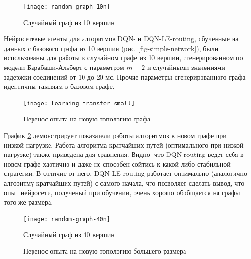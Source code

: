 \documentclass[specification,annotation,times]{itmo-student-thesis}
\theoremstyle{definition}
\begin{document}
\begin{figure}[!h]
  \caption{Случайный граф из 10 вершин}\label{fig-random-net-10n}
  \centering
  \texttt{[image: random-graph-10n]}
\end{figure}

Нейросетевые агенты для алгоритмов DQN- и DQN-LE-routing, обученные на данных с
базового графа из 10 вершин (рис. \ref{fig-simple-network}), были использованы
для работы в случайном графе из 10 вершин, сгенерированном по модели
Барабаши-Альберт с параметром $m = 2$ и случайными значениями задержки
соединений от 10 до 20 мс. Прочие параметры сгенерированного графа идентичны
таковым в базовом графе. 

\begin{figure}[!h]
  \caption{Перенос опыта на новую топологию графа}\label{experiments:network:transfer-small}
  \centering
  \texttt{[image: learning-transfer-small]}
\end{figure}

График \ref{experiments:network:transfer-small} демонстрирует показатели работы
алгоритмов в новом графе при низкой нагрузке. Работа алгоритма кратчайших
путей (оптимального при низкой нагрузке) также приведена для сравнения. Видно,
что DQN-routing ведет себя в новом графе хаотично и даже не способен сойтись к
какой-либо стабильной стратегии. В отличие от него, DQN-LE-routing работает
оптимально (аналогично алгоритму кратчайших путей) с самого начала, что
позволяет сделать вывод, что опыт нейросети, полученый при обучении, очень
хорошо обобщается на графы того же размера.

\begin{figure}[!h]
  \caption{Случайный граф из 40 вершин}\label{fig-random-net-40n}
  \centering
  \texttt{[image: random-graph-40n]}
\end{figure}

\begin{figure}[!h]
  \centering
  \hfil
  \caption{Перенос опыта на новую топологию большего размера}\label{experiments:network:transfer-big}
\end{figure}
\end{document}
